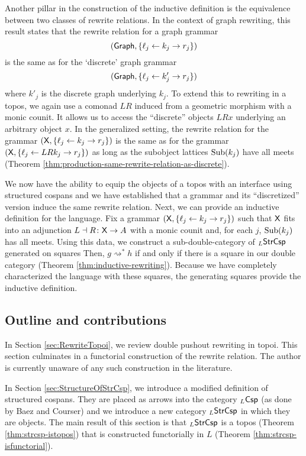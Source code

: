\documentclass{amsart}
\begin{document}
Another pillar in the construction of the
inductive definition is the equivalence between
two classes of rewrite relations.  In the context
of graph rewriting, this result states that the
rewrite relation for a graph grammar
$$(\mathsf{Graph} , \{ \ell_j \leftarrow k_j \to r_j\})$$ is the same as for the `discrete' graph
grammar
$$( \mathsf{Graph} , \{ \ell_j \leftarrow k'_j \to r_j\})$$ where $ k'_j $ is the discrete graph
underlying $ k_j $.  To extend this to rewriting
in a topos, we again use a comonad $ LR $ induced
from a geometric morphism with a monic counit. It
allows us to access the ``discrete'' objects
$ LRx $ underlying an arbitrary object $ x $.  In
the generalized setting, the rewrite relation for
the grammar
$ ( \mathsf{X}, \{ \ell_j \leftarrow k_j \to r_j\}) $
is the same as for the grammar
$ (\mathsf{X} , \{ \ell_j \leftarrow LR k_j \to r_j\}) $ as long as the subobject lattices
$ \operatorname{Sub} (k_j) $ have all meets (Theorem
\ref{thm:production-same-rewrite-relation-as-discrete}).

We now have the ability to equip the objects of a
topos with an interface using structured cospans
and we have established that a grammar and its
``discretized'' version induce the same rewrite relation.
Next, we can provide an inductive definition for
the language. Fix a grammar
$ (\mathsf{X}, \{ \ell_j \leftarrow k_j \to r_j\}) $
such that $ \mathsf{X} $ fits into an adjunction
$ L \dashv R \colon \mathsf{X} \to A $ with a monic counit
and, for each $ j $, $ \operatorname{Sub} (k_j) $ has all meets.
Using this data, we construct a
sub-double-category of $ _L\mathsf{StrCsp} $ generated on
squares 
Then, $ g \rightsquigarrow^\ast h$ if and only
if there is a square
 in our double
category (Theorem \ref{thm:inductive-rewriting}).
Because we have completely characterized the
language with these squares, the generating
squares provide the inductive definition. 

\subsection{Outline and contributions}
\label{sec:outl-contr}

In Section \ref{sec:RewriteTopoi}, we review
double pushout rewriting in topoi. This section
culminates in a functorial construction of the
rewrite relation.  The author is currently unaware
of any such construction in the literature.

In Section \ref{sec:StructureOfStrCsp}, we
introduce a modified definition of structured
cospans. They are placed as arrows into the
category $ _L\mathsf{Csp} $ (as done by Baez and Courser)
and we introduce a new category $ _L\mathsf{StrCsp} $ in
which they are objects. The main result of this
section is that $ _L\mathsf{StrCsp} $ is a topos (Theorem
\ref{thm:strcsp-istopos}) that is
constructed functorially in $ L $ (Theorem
\ref{thm:strcsp-isfunctorial}).
\end{document}
